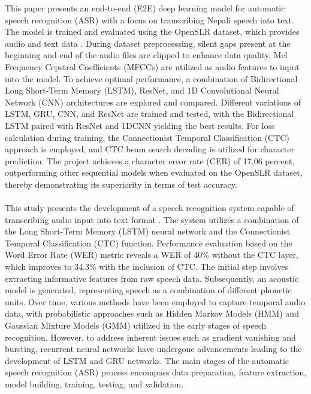 This paper presents an end-to-end (E2E) deep learning model for automatic speech recognition (ASR) with a focus on transcribing Nepali speech into text. The model is trained and evaluated using the OpenSLR dataset, which provides audio and text data \cite{dhakal2022automatic}. During dataset preprocessing, silent gaps present at the beginning and end of the audio files are clipped to enhance data quality. Mel Frequency Cepstral Coefficients (MFCCs) are utilized as audio features to input into the model. To achieve optimal performance, a combination of Bidirectional Long Short-Term Memory (LSTM), ResNet, and 1D Convolutional Neural Network (CNN) architectures are explored and compared. Different variations of LSTM, GRU, CNN, and ResNet are trained and tested, with the Bidirectional LSTM paired with ResNet and 1DCNN yielding the best results. For loss calculation during training, the Connectionist Temporal Classification (CTC) approach is employed, and CTC beam search decoding is utilized for character prediction. The project achieves a character error rate (CER) of 17.06 percent, outperforming other sequential models when evaluated on the OpenSLR dataset, thereby demonstrating its superiority in terms of test accuracy.
\\
\\
This study presents the development of a speech recognition system capable of transcribing audio input into text format \cite{shrestha2021nepali}. The system utilizes a combination of the Long Short-Term Memory (LSTM) neural network and the Connectionist Temporal Classification (CTC) function. Performance evaluation based on the Word Error Rate (WER) metric reveals a WER of 40\% without the CTC layer, which improves to 34.3\% with the inclusion of CTC. The initial step involves extracting informative features from raw speech data. Subsequently, an acoustic model is generated, representing speech as a combination of different phonetic units. Over time, various methods have been employed to capture temporal audio data, with probabilistic approaches such as Hidden Markov Models (HMM) and Gaussian Mixture Models (GMM) utilized in the early stages of speech recognition. However, to address inherent issues such as gradient vanishing and bursting, recurrent neural networks have undergone advancements leading to the development of LSTM and GRU networks. The main stages of the automatic speech recognition (ASR) process encompass data preparation, feature extraction, model building, training, testing, and validation.
\\
\\
